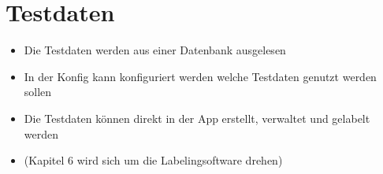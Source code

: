 \section{Testdaten}\label{sec:testdaten}

\begin{itemize}
    \item Die Testdaten werden aus einer Datenbank ausgelesen
    \item In der Konfig kann konfiguriert werden welche Testdaten genutzt werden sollen
    \item Die Testdaten können direkt in der App erstellt, verwaltet und gelabelt werden
    \item (Kapitel 6 wird sich um die Labelingsoftware drehen)
\end{itemize}